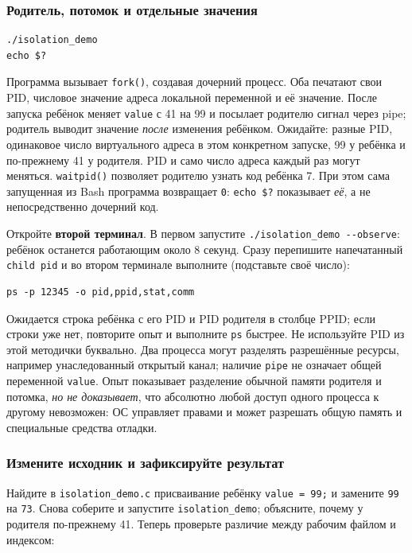 \subsubsection*{Родитель, потомок и отдельные значения}

\begin{verbatim}
./isolation_demo
echo $?
\end{verbatim}

Программа вызывает \texttt{fork()}, создавая дочерний процесс. Оба
печатают свои PID, числовое значение адреса локальной переменной и её
значение. После запуска ребёнок меняет \texttt{value} с 41 на 99 и
посылает родителю сигнал через pipe; родитель выводит значение \emph{после}
изменения ребёнком. Ожидайте: разные PID, одинаковое число виртуального
адреса в этом конкретном запуске, 99 у ребёнка и по-прежнему 41 у родителя.
PID и само число адреса каждый раз могут меняться. \texttt{waitpid()}
позволяет родителю узнать код ребёнка 7. При этом сама запущенная из Bash
программа возвращает \texttt{0}: \texttt{echo \$?} показывает \emph{её},
а не непосредственно дочерний код.

Откройте \textbf{второй терминал}. В первом запустите
\texttt{./isolation\_demo -{}-observe}: ребёнок останется работающим около
8 секунд. Сразу перепишите напечатанный \texttt{child pid} и во втором
терминале выполните (подставьте своё число):

\begin{verbatim}
ps -p 12345 -o pid,ppid,stat,comm
\end{verbatim}

Ожидается строка ребёнка с его PID и PID родителя в столбце PPID; если
строки уже нет, повторите опыт и выполните \texttt{ps} быстрее. Не
используйте PID из этой методички буквально. Два процесса могут разделять
разрешённые ресурсы, например унаследованный открытый канал; наличие
\texttt{pipe} не означает общей переменной \texttt{value}. Опыт показывает
разделение обычной памяти родителя и потомка, \emph{но не доказывает}, что
абсолютно любой доступ одного процесса к другому невозможен: ОС управляет
правами и может разрешать общую память и специальные средства отладки.

\subsubsection*{Измените исходник и зафиксируйте результат}

Найдите в \texttt{isolation\_demo.c} присваивание ребёнку
\texttt{value = 99;} и замените \texttt{99} на \texttt{73}. Снова соберите
и запустите \texttt{isolation\_demo}; объясните, почему у родителя
по-прежнему 41. Теперь проверьте различие между рабочим файлом и индексом:

